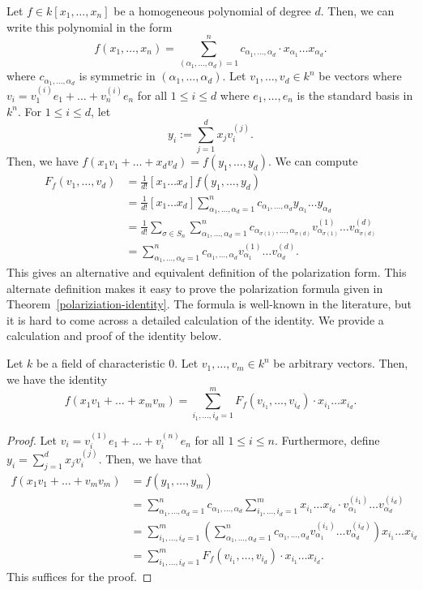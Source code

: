 \documentclass{puthesis-UG}
\begin{document}
Let $f \in k[x_1, \ldots, x_n]$ be a homogeneous polynomial of degree $d$. Then, we can write this polynomial in the form 
\[
	f(x_1, \ldots, x_n) = \sum_{(\alpha_1, \ldots, \alpha_d) = 1}^n c_{\alpha_1, \ldots, \alpha_d} \cdot x_{\alpha_1} \ldots x_{\alpha_d}.
\]
where $c_{\alpha_1, \ldots, \alpha_d}$ is symmetric in $(\alpha_1, \ldots, \alpha_d)$. Let $v_1, \ldots, v_d\in k^n$ be vectors where $v_i = v_1^{(i)} e_1 + \ldots + v_n^{(i)} e_n$ for all $1 \leq i \leq d$ where $e_1, \ldots, e_n$ is the standard basis in $k^n$. For $1 \leq i \leq d$, let 
\[
	y_i := \sum_{j = 1}^d x_j v_i^{(j)}.
\]
Then, we have $f(x_1 v_1 + \ldots + x_d v_d) = f(y_1, \ldots, y_d)$. We can compute
\begin{align*}
	F_f(v_1, \ldots, v_d) & = \frac{1}{d!}[x_1 \ldots x_d] f(y_1, \ldots, y_d) \\
	& = \frac{1}{d!} [x_1 \ldots x_d] \sum_{\alpha_1, \ldots, \alpha_d = 1}^n c_{\alpha_1, \ldots, \alpha_d} y_{\alpha_1} \ldots y_{\alpha_d} \\
	& = \frac{1}{d!} \sum_{\sigma \in S_n} \sum_{\alpha_1, \ldots, \alpha_d = 1}^n c_{\alpha_{\sigma(1)}, \ldots, \alpha_{\sigma(d)}} v_{\alpha_{\sigma(1)}}^{(1)} \ldots v_{\alpha_{\sigma(d)}}^{(d)} \\
	& = \sum_{\alpha_1, \ldots, \alpha_d = 1}^n c_{\alpha_1, \ldots, \alpha_d} v_{\alpha_1}^{(1)} \ldots v_{\alpha_d}^{(d)}.
\end{align*}
This gives an alternative and equivalent definition of the polarization form. This alternate definition makes it easy to prove the polarization formula given in Theorem~\ref{polariziation-identity}. The formula is well-known in the literature, but it is hard to come across a detailed calculation of the identity. We provide a calculation and proof of the identity below. 

\begin{thm} \label{polariziation-identity}
	Let $k$ be a field of characteristic $0$. Let $v_1, \ldots, v_m \in k^n$ be arbitrary vectors. Then, we have the identity
	\[
		f(x_1 v_1 + \ldots + x_m v_m ) = \sum_{i_1, \ldots, i_d = 1}^m F_f(v_{i_1}, \ldots, v_{i_d}) \cdot x_{i_1} \ldots x_{i_d}.
	\]
\end{thm}
\begin{proof}
	Let $v_i = v_i^{(1)} e_1 + \ldots + v_i^{(n)} e_n$ for all $1 \leq i \leq n$. Furthermore, define $y_i = \sum_{j = 1}^d x_j v_i^{(j)}$. Then, we have that 
	\begin{align*}
		f(x_1 v_1 + \ldots + v_m v_m) & = f(y_1, \ldots, y_m) \\
		& = \sum_{\alpha_1, \ldots, \alpha_d = 1}^n c_{\alpha_1, \ldots, \alpha_d} \sum_{i_1, \ldots, i_d = 1}^m x_{i_1} \ldots x_{i_d} \cdot v_{\alpha_1}^{(i_1)} \ldots v_{\alpha_d}^{(i_d)} \\
		& = \sum_{i_1, \ldots, i_d = 1}^m \left ( \sum_{\alpha_1, \ldots, \alpha_d = 1}^n c_{\alpha_1, \ldots, \alpha_d} v_{\alpha_1}^{(i_1)} \ldots v_{\alpha_d}^{(i_d)}\right ) x_{i_1} \ldots x_{i_d} \\
		& = \sum_{i_1, \ldots, i_d = 1}^m F_f(v_{i_1}, \ldots, v_{i_d}) \cdot x_{i_1} \ldots x_{i_d}.
	\end{align*}
	This suffices for the proof. 
\end{proof}
\end{document}
